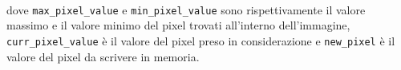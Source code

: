 \documentclass[11pt, a4paper]{article}
\DeclarePairedDelimiter\floor{\lfloor}{\rfloor}
\begin{document}
\noindent{}
\\
\\
\\
dove \texttt{max\_pixel\_value} e \texttt{min\_pixel\_value} sono rispettivamente il valore massimo e il valore minimo del pixel trovati all'interno dell'immagine, \texttt{curr\_pixel\_value} è il valore del pixel preso in considerazione e \texttt{new\_pixel} è il valore del pixel da scrivere in memoria.
\pagebreak
\end{document}
